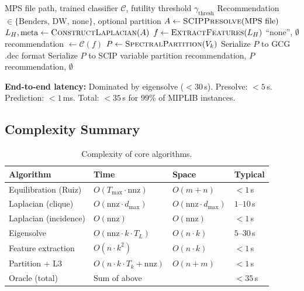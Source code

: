 \documentclass[12pt]{article}
\begin{document}
\begin{algorithm}[ht]
\caption{Decomposition Selection Oracle}
\label{alg:oracle}
\begin{algorithmic}[1]
\Require MPS file path, trained classifier $\mathcal{C}$, futility threshold $\gamma_{\mathrm{thresh}}$
\Ensure Recommendation $\in \{\text{Benders, DW, none}\}$, optional partition
\State $A \gets \textsc{SCIPPresolve}(\text{MPS file})$
\State $L_H, \mathrm{meta} \gets \textsc{ConstructLaplacian}(A)$
\State $f \gets \textsc{ExtractFeatures}(L_H)$
  \State \Return ``none'', $\emptyset$
\EndIf
\State recommendation $\gets \mathcal{C}(f)$
  \State $P \gets \textsc{SpectralPartition}(V_k)$
    \State Serialize $P$ to GCG .dec format
    \State Serialize $P$ to SCIP variable partition
  \EndIf
  \State \Return recommendation, $P$
\EndIf
\State \Return recommendation, $\emptyset$
\end{algorithmic}
\end{algorithm}

\textbf{End-to-end latency:} Dominated by eigensolve ($< 30$\,s).
Presolve: $< 5$\,s.  Prediction: $< 1$\,ms.  Total: $< 35$\,s for 99\%
of MIPLIB instances.

\subsection{Complexity Summary}

\begin{table}[ht]
\centering
\caption{Complexity of core algorithms.}
\label{tab:complexity}
\small
\begin{tabular}{@{}llll@{}}
\toprule
Algorithm & Time & Space & Typical \\
\midrule
Equilibration (Ruiz) & $O(T_{\max} \cdot \mathrm{nnz})$ & $O(m+n)$ & $< 1$\,s \\
Laplacian (clique) & $O(\mathrm{nnz} \cdot d_{\max})$ & $O(\mathrm{nnz} \cdot d_{\max})$ & $1$--$10$\,s \\
Laplacian (incidence) & $O(\mathrm{nnz})$ & $O(\mathrm{nnz})$ & $< 1$\,s \\
Eigensolve & $O(\mathrm{nnz} \cdot k \cdot T_L)$ & $O(n \cdot k)$ & $5$--$30$\,s \\
Feature extraction & $O(n \cdot k^2)$ & $O(n \cdot k)$ & $< 1$\,s \\
Partition + L3 & $O(n \cdot k \cdot T_k + \mathrm{nnz})$ & $O(n + m)$ & $< 1$\,s \\
Oracle (total) & \multicolumn{2}{l}{Sum of above} & $< 35$\,s \\
\bottomrule
\end{tabular}
\end{table}
\end{document}
